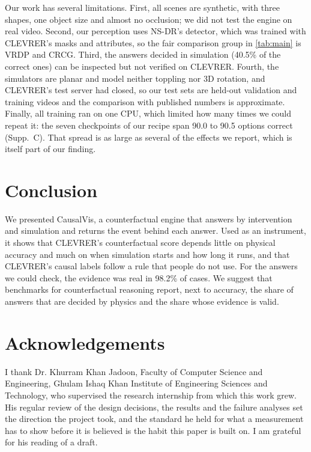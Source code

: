 \IfFileExists{TMLR}{\documentclass[10pt]{article}}%
\newif\ifanon
\newcommand{\sys}{CausalVis}
\begin{document}
Our work has several limitations.
First, all scenes are synthetic, with three shapes, one object size and almost no occlusion; we did not test the engine on real video.
Second, our perception uses NS-DR's detector, which was trained with CLEVRER's masks and attributes, so the fair comparison group in \cref{tab:main} is VRDP and CRCG.
Third, the answers decided in simulation (40.5\% of the correct ones) can be inspected but not verified on CLEVRER.
Fourth, the simulators are planar and model neither toppling nor 3D rotation, and CLEVRER's test server had closed, so our test sets are held-out validation and training videos and the comparison with published numbers is approximate.
Finally, all training ran on one CPU, which limited how many times we could repeat it: the seven checkpoints of our recipe span 90.0 to 90.5 options correct (Supp.~C).
That spread is as large as several of the effects we report, which is itself part of our finding.

\section{Conclusion}
\label{sec:conclusion}

We presented \sys{}, a counterfactual engine that answers by intervention and simulation and returns the event behind each answer.
Used as an instrument, it shows that CLEVRER's counterfactual score depends little on physical accuracy and much on when simulation starts and how long it runs, and that CLEVRER's causal labels follow a rule that people do not use.
For the answers we could check, the evidence was real in 98.2\% of cases.
We suggest that benchmarks for counterfactual reasoning report, next to accuracy, the share of answers that are decided by physics and the share whose evidence is valid.

\ifanon\else
\section*{Acknowledgements}
I thank Dr. Khurram Khan Jadoon, Faculty of Computer Science and Engineering, Ghulam Ishaq Khan Institute of Engineering Sciences and Technology, who supervised the research internship from which this work grew.
His regular review of the design decisions, the results and the failure analyses set the direction the project took, and the standard he held for what a measurement has to show before it is believed is the habit this paper is built on.
I am grateful for his reading of a draft.
\end{document}
